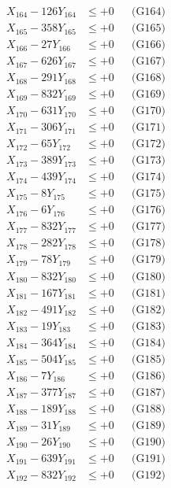 \documentclass[a4paper,10pt]{article}
\begin{document}
{\begin{align}
X_{164} - 126Y_{164} &\leq +0 && \text{(G164)} \\
X_{165} - 358Y_{165} &\leq +0 && \text{(G165)} \\
X_{166} - 27Y_{166} &\leq +0 && \text{(G166)} \\
X_{167} - 626Y_{167} &\leq +0 && \text{(G167)} \\
X_{168} - 291Y_{168} &\leq +0 && \text{(G168)} \\
X_{169} - 832Y_{169} &\leq +0 && \text{(G169)} \\
X_{170} - 631Y_{170} &\leq +0 && \text{(G170)} \\
\allowbreak
X_{171} - 306Y_{171} &\leq +0 && \text{(G171)} \\
X_{172} - 65Y_{172} &\leq +0 && \text{(G172)} \\
X_{173} - 389Y_{173} &\leq +0 && \text{(G173)} \\
X_{174} - 439Y_{174} &\leq +0 && \text{(G174)} \\
X_{175} - 8Y_{175} &\leq +0 && \text{(G175)} \\
X_{176} - 6Y_{176} &\leq +0 && \text{(G176)} \\
X_{177} - 832Y_{177} &\leq +0 && \text{(G177)} \\
X_{178} - 282Y_{178} &\leq +0 && \text{(G178)} \\
X_{179} - 78Y_{179} &\leq +0 && \text{(G179)} \\
X_{180} - 832Y_{180} &\leq +0 && \text{(G180)} \\
\allowbreak
X_{181} - 167Y_{181} &\leq +0 && \text{(G181)} \\
X_{182} - 491Y_{182} &\leq +0 && \text{(G182)} \\
X_{183} - 19Y_{183} &\leq +0 && \text{(G183)} \\
X_{184} - 364Y_{184} &\leq +0 && \text{(G184)} \\
X_{185} - 504Y_{185} &\leq +0 && \text{(G185)} \\
X_{186} - 7Y_{186} &\leq +0 && \text{(G186)} \\
X_{187} - 377Y_{187} &\leq +0 && \text{(G187)} \\
X_{188} - 189Y_{188} &\leq +0 && \text{(G188)} \\
X_{189} - 31Y_{189} &\leq +0 && \text{(G189)} \\
X_{190} - 26Y_{190} &\leq +0 && \text{(G190)} \\
\allowbreak
X_{191} - 639Y_{191} &\leq +0 && \text{(G191)} \\
X_{192} - 832Y_{192} &\leq +0 && \text{(G192)} \\

\end{align}}
\end{document}

